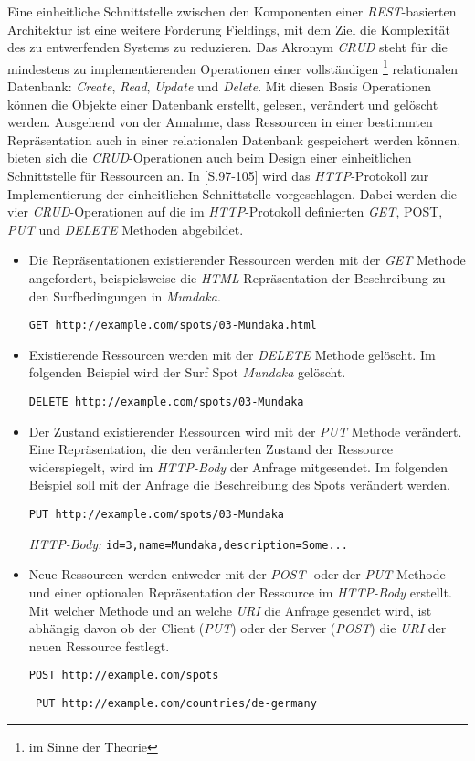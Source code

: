 Eine einheitliche Schnittstelle zwischen den Komponenten einer
\textit{REST}-basierten Architektur ist eine weitere Forderung
Fieldings, mit dem Ziel die Komplexität des zu entwerfenden Systems zu
reduzieren. Das Akronym \textit{CRUD}  steht für die mindestens zu implementierenden
Operationen einer vollständigen \footnote{im Sinne der Theorie}
relationalen Datenbank: \textit{Create}, \textit{Read},
\textit{Update} und \textit{Delete}. Mit diesen Basis Operationen
können die Objekte einer Datenbank erstellt, gelesen, verändert und
gelöscht werden. Ausgehend von der Annahme, dass Ressourcen in einer
bestimmten Repräsentation auch in einer relationalen Datenbank
gespeichert werden können, bieten sich die \textit{CRUD}-Operationen
auch beim Design einer einheitlichen Schnittstelle für Ressourcen
an. In \cite{Richardson07}[S.97-105] wird das \textit{HTTP}-Protokoll
zur Implementierung der einheitlichen Schnittstelle
vorgeschlagen. Dabei werden die vier \textit{CRUD}-Operationen auf die
im \textit{HTTP}-Protokoll definierten \textit{GET}, \textup{POST},
\textit{PUT} und \textit{DELETE} Methoden abgebildet.

\begin{itemize}
\item Die Repräsentationen existierender Ressourcen werden mit der
  \textit{GET} Methode angefordert, beispielsweise die \textit{HTML}
  Repräsentation der Beschreibung zu den Surfbedingungen in
  \textit{Mundaka}.

  \texttt{GET http://example.com/spots/03-Mundaka.html}

\item Existierende Ressourcen werden mit der \textit{DELETE} Methode
  gelöscht. Im folgenden Beispiel wird der Surf Spot \textit{Mundaka}
  gelöscht.

  \texttt{DELETE http://example.com/spots/03-Mundaka}

\item Der Zustand existierender Ressourcen wird mit der \textit{PUT}
  Methode verändert. Eine Repräsentation, die den veränderten Zustand
  der Ressource widerspiegelt, wird im \textit{HTTP-Body} der Anfrage
  mitgesendet. Im folgenden Beispiel soll mit der Anfrage die
  Beschreibung des Spots verändert werden.

  \texttt{PUT http://example.com/spots/03-Mundaka}

  \textit{HTTP-Body:} \texttt{id=3,name=Mundaka,description=Some...}

\item Neue Ressourcen werden entweder mit der \textit{POST}- oder der
  \textit{PUT} Methode und einer optionalen Repräsentation der
  Ressource im \textit{HTTP-Body} erstellt. Mit welcher Methode und an
  welche \textit{URI} die Anfrage gesendet wird, ist abhängig davon ob
  der Client (\textit{PUT}) oder der Server (\textit{POST}) die
  \textit{URI} der neuen Ressource festlegt.

  \texttt{POST http://example.com/spots}

  \texttt{ PUT http://example.com/countries/de-germany}

\end{itemize}

